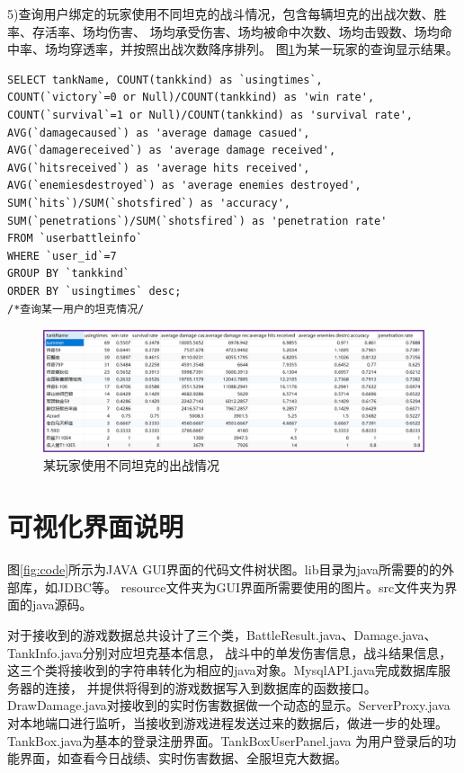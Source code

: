 \documentclass[UTF8, a4paper]{ctexart}
\begin{document}
5)查询用户绑定的玩家使用不同坦克的战斗情况，包含每辆坦克的出战次数、胜率、存活率、场均伤害、
场均承受伤害、场均被命中次数、场均击毁数、场均命中率、场均穿透率，并按照出战次数降序排列。
图\ref{fig:userresult}为某一玩家的查询显示结果。
\begin{lstlisting}[style=A]
SELECT tankName, COUNT(tankkind) as `usingtimes`, 
COUNT(`victory`=0 or Null)/COUNT(tankkind) as 'win rate',
COUNT(`survival`=1 or Null)/COUNT(tankkind) as 'survival rate', 
AVG(`damagecaused`) as 'average damage casued',
AVG(`damagereceived`) as 'average damage received', 
AVG(`hitsreceived`) as 'average hits received',
AVG(`enemiesdestroyed`) as 'average enemies destroyed',
SUM(`hits`)/SUM(`shotsfired`) as 'accuracy',
SUM(`penetrations`)/SUM(`shotsfired`) as 'penetration rate'
FROM `userbattleinfo`
WHERE `user_id`=7
GROUP BY `tankkind`
ORDER BY `usingtimes` desc;	
/*查询某一用户的坦克情况/
\end{lstlisting}
 \begin{figure}[h]
    \centering
    \includegraphics[width=1\textwidth]{userresult.png}
    \caption{某玩家使用不同坦克的出战情况}
    \label{fig:userresult}
  \end{figure}

\section{可视化界面说明}

图\ref{fig:code}所示为JAVA GUI界面的代码文件树状图。lib目录为java所需要的的外部库，如JDBC等。
resource文件夹为GUI界面所需要使用的图片。src文件夹为界面的java源码。

对于接收到的游戏数据总共设计了三个类，BattleResult.java、Damage.java、TankInfo.java分别对应坦克基本信息，
战斗中的单发伤害信息，战斗结果信息，这三个类将接收到的字符串转化为相应的java对象。MysqlAPI.java完成数据库服务器的连接，
并提供将得到的游戏数据写入到数据库的函数接口。DrawDamage.java对接收到的实时伤害数据做一个动态的显示。ServerProxy.java
对本地端口进行监听，当接收到游戏进程发送过来的数据后，做进一步的处理。TankBox.java为基本的登录注册界面。TankBoxUserPanel.java
为用户登录后的功能界面，如查看今日战绩、实时伤害数据、全服坦克大数据。
\end{document}
